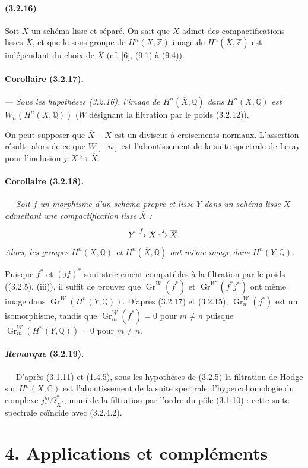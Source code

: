 \documentclass[10pt]{article}
\newcommand{\C}{\mathbb C}
\newcommand{\Q}{\mathbb Q}
\newcommand{\Z}{\mathbb Z}
\newcommand{\Gr}{\operatorname{Gr}}
\begin{document}
\paragraph{(3.2.16)} Soit $X$ un schéma lisse et séparé. On sait que $X$ admet des compactifications lisses $\overline X$, et que le sous-groupe de $H^n(X,\Z)$ image de $H^n(\overline X,\Z)$ est indépendant du choix de $\overline X$ (cf. [6], (9.1) à (9.4)).

\paragraph{Corollaire (3.2.17).} --- {\itshape Sous les hypothèses (3.2.16), l'image de $H^n(\overline X,\Q)$ dans $H^n(X,\Q)$ est} $W_n(H^n(X,\Q))$ ($W$ désignant la filtration par le poids (3.2.12)).

On peut supposer que $\overline X-X$ est un diviseur à croisements normaux. L'assertion résulte alors de ce que $W[-n]$ est l'aboutissement de la suite spectrale de Leray pour l'inclusion $j:X\hookrightarrow\overline X$.

\paragraph{Corollaire (3.2.18).} --- {\itshape Soit $f$ un morphisme d'un schéma propre et lisse $Y$ dans un schéma lisse $X$ admettant une compactification lisse $\overline X$ :
\[
Y\xrightarrow{f}X\xhookrightarrow{j}\overline X.
\]
Alors, les groupes $H^n(X,\Q)$ et $H^n(\overline X,\Q)$ ont même image dans $H^n(Y,\Q)$.}

Puisque $f^*$ et $(jf)^*$ sont strictement compatibles à la filtration par le poids ((3.2.5), (iii)), il suffit de prouver que $\Gr^W(f^*)$ et $\Gr^W(f^*j^*)$ ont même image dans $\Gr^W(H^n(Y,\Q))$. D'après (3.2.17) et (3.2.15), $\Gr_n^W(j^*)$ est un isomorphisme, tandis que $\Gr_m^W(f^*)=0$ pour $m\ne n$ puisque $\Gr_m^W(H^n(Y,\Q))=0$ pour $m\ne n$.

\paragraph{\emph{Remarque} (3.2.19).} --- D'après (3.1.11) et (1.4.5), sous les hypothèses de (3.2.5) la filtration de Hodge sur $H^n(X,\C)$ est l'aboutissement de la suite spectrale d'hypercohomologie du complexe $j_*^m\Omega_{X^*}^{*}$, muni de la filtration par l'ordre du pôle (3.1.10) : cette suite spectrale coïncide avec (3.2.4.2).

\section*{4. Applications et compléments}
\end{document}
